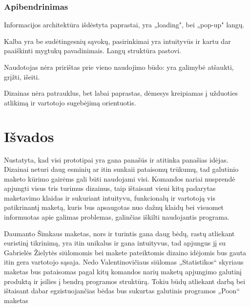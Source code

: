 \documentclass{VUMIFPSkursinis}
\begin{document}
\subsubsection{Apibendrinimas}
Informacijos architektūra išdėstyta paprastai, yra „loading", bei „pop-up" langų.

Kalba yra be sudėtingesnių sąvokų, pasirinkimai yra intuityvūs ir kartu dar paaiškinti mygtukų pavadinimais. Langų struktūra pastovi.

Naudotojas nėra pririštas prie vieno naudojimo būdo: yra galimybė atšaukti, grįžti, išeiti.

Dizainas nėra patrauklus, bet labai paprastas, dėmesys kreipiamas į užduoties atlikimą ir vartotojo sugebėjimą orientuotis.

\section{Išvados}
Nustatyta, kad visi prototipai yra gana panašūs ir atitinka panašias idėjas. Dizainai neturi daug esminių ar itin sunkaii pataisomų trūkumų, tad galutinio maketo kūrimo gairėms gali būti naudojami visi. Komandos nariai nusprendė apjungti visus tris turimus dizainus, taip ištaisant vieni kitų padarytas maketavimo klaidas ir sukuriant intuityvu, funkcionalų ir vartotoją vis patikrinantį maketą, kuris bus apsaugotas nuo dažnų klaidų bei visuomet informuotas apie galimas problemas, galinčias iškilti naudojantis programa.

Daumanto Šimkaus maketas, nors ir turintis gana daug bėdų, rastų atliekant euristinį tikrinimą, yra itin unikalus ir gana intuityvus, tad apjungus jį su Gabrielės Žielytės siūlomomis bei makete pateiktomis dizaino idėjomis bus gauta itin gera vartotojo sąsaja. Nedo Valentinovičiaus siūlomas „Statistikos“ skyriaus maketas bus pataisomas pagal kitų komandos narių maketų apjungimo galutinį produktą ir įsilies į bendrą programos struktūrą. Tokiu būdų atliekant darbą bei ištaisant dabar egzistuojančias bėdas bus sukurtas galutinis programos „Poon“ maketas

















\printbibliography[heading=bibintoc, title=Šaltiniai]  %
\end{document}
